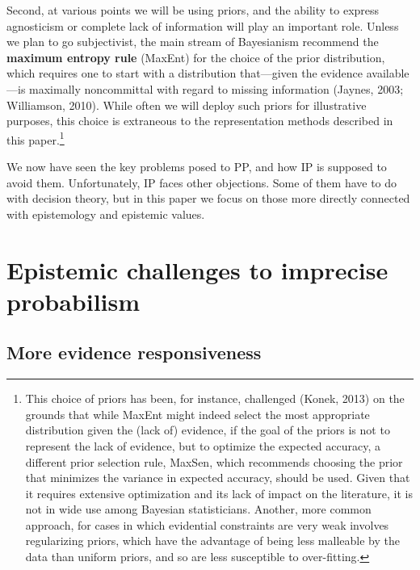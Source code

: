 \documentclass[
  10pt,
  dvipsnames,enabledeprecatedfontcommands]{scrartcl}
\begin{document}
Second, at various points we will be using priors, and the ability to
express agnosticism or complete lack of information will play an
important role. Unless we plan to go subjectivist, the main stream of
Bayesianism recommend the \textbf{maximum entropy rule} (MaxEnt) for the
choice of the prior distribution, which requires one to start with a
distribution that---given the evidence available---is maximally
noncommittal with regard to missing information (Jaynes, 2003;
Williamson, 2010). While often we will deploy such priors for
illustrative purposes, this choice is extraneous to the representation
methods described in this paper.\footnote{This choice of priors has
  been, for instance, challenged (Konek, 2013) on the grounds that while
  MaxEnt might indeed select the most appropriate distribution given the
  (lack of) evidence, if the goal of the priors is not to represent the
  lack of evidence, but to optimize the expected accuracy, a different
  prior selection rule, MaxSen, which recommends choosing the prior that
  minimizes the variance in expected accuracy, should be used. Given
  that it requires extensive optimization and its lack of impact on the
  literature, it is not in wide use among Bayesian statisticians.
  Another, more common approach, for cases in which evidential
  constraints are very weak involves regularizing priors, which have the
  advantage of being less malleable by the data than uniform priors, and
  so are less susceptible to over-fitting.}

We now have seen the key problems posed to PP, and how IP is supposed to
avoid them. Unfortunately, IP faces other objections. Some of them have
to do with decision theory, but in this paper we focus on those more
directly connected with epistemology and epistemic values.

\hypertarget{epistemic-challenges-to-imprecise-probabilism}{%
\section{\texorpdfstring{Epistemic challenges to imprecise probabilism
\label{sec:epistemic}}{Epistemic challenges to imprecise probabilism }}\label{epistemic-challenges-to-imprecise-probabilism}}

\hypertarget{more-evidence-responsiveness}{%
\subsection{More evidence
responsiveness}\label{more-evidence-responsiveness}}
\end{document}
